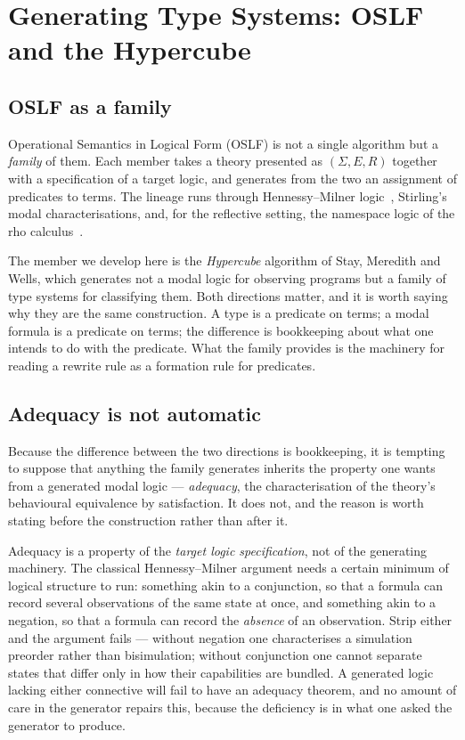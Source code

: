 \chapter{Generating Type Systems: OSLF and the Hypercube}
\label{ch:hypercube}

\section{OSLF as a family}

Operational Semantics in Logical Form (OSLF) is not a single algorithm but a
\emph{family} of them. Each member takes a theory presented as $(\Sigma, E, R)$ together
with a specification of a target logic, and generates from the two an assignment of
predicates to terms. The lineage runs through Hennessy--Milner
logic~\cite{HennessyMilner1985}, Stirling's modal characterisations, and, for the
reflective setting, the namespace logic of the rho calculus~\cite{NamespaceLogic}.

The member we develop here is the \emph{Hypercube} algorithm of Stay, Meredith and
Wells, which generates not a modal logic for observing programs but a family of type
systems for classifying them. Both directions matter, and it is worth saying why they are
the same construction. A type is a predicate on terms; a modal formula is a predicate on
terms; the difference is bookkeeping about what one intends to do with the predicate. What
the family provides is the machinery for reading a rewrite rule as a formation rule for
predicates.

\section{Adequacy is not automatic}
\label{ob:subsec:adequacy}

Because the difference between the two directions is bookkeeping, it is tempting to
suppose that anything the family generates inherits the property one wants from a
generated modal logic --- \emph{adequacy}, the characterisation of the theory's
behavioural equivalence by satisfaction. It does not, and the reason is worth stating
before the construction rather than after it.

Adequacy is a property of the \emph{target logic specification}, not of the generating
machinery. The classical Hennessy--Milner argument needs a certain minimum of logical
structure to run: something akin to a conjunction, so that a formula can record several
observations of the same state at once, and something akin to a negation, so that a
formula can record the \emph{absence} of an observation. Strip either and the argument
fails --- without negation one characterises a simulation preorder rather than
bisimulation; without conjunction one cannot separate states that differ only in how
their capabilities are bundled. A generated logic lacking either connective will fail to
have an adequacy theorem, and no amount of care in the generator repairs this, because
the deficiency is in what one asked the generator to produce.

